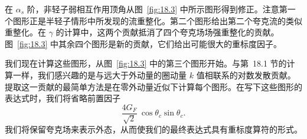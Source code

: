 在 $\alpha_s$ 阶，非轻子弱相互作用顶角从图~\ref{fig:18.3} 中所示图形得到修正。注意第一个图形正是半轻子情形中所发现的流重整化。第二个图形给出第二个夸克流的类似重整化。在 $\gamma$ 的计算中，这两个贡献抵消了四个夸克场场强重整化的贡献。图~\ref{fig:18.3} 中其余四个图形是新的贡献，它们给出可能很大的重标度因子。

我们现在计算这些图形，从图~\ref{fig:18.3} 中的第三个图形开始。与第~18.1 节的计算一样，我们感兴趣的是与远大于外动量的圈动量 $k$ 值相联系的对数发散贡献。提取这一贡献的最简单方法是在零外动量近似下计算每个图形。在写下这些图形的表达式时，我们将省略前置因子
\begin{equation}
  \frac{4G_F}{\sqrt{2}}\ \cos\theta_c\sin\theta_c .
  \label{eq:18.34}
\end{equation}
我们将保留夸克场来表示外态，从而使我们的最终表达式具有重标度算符的形式。

